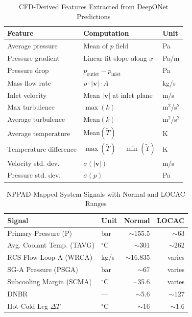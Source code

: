 \documentclass[conference]{IEEEtran}
\begin{document}
\begin{table}[htbp]
\caption{CFD-Derived Features Extracted from DeepONet Predictions}
\label{tab:features}
\centering
\begin{tabular}{lll}
\toprule
\textbf{Feature} & \textbf{Computation} & \textbf{Unit} \\
\midrule
Average pressure & Mean of $p$ field & Pa \\
Pressure gradient & Linear fit slope along $x$ & Pa/m \\
Pressure drop & $p_\text{outlet} - p_\text{inlet}$ & Pa \\
Mass flow rate & $\rho \cdot |\mathbf{v}| \cdot A$ & kg/s \\
Inlet velocity & Mean $|\mathbf{v}|$ at inlet plane & m/s \\
Max turbulence & $\max(k)$ & m$^2$/s$^2$ \\
Average turbulence & Mean$(k)$ & m$^2$/s$^2$ \\
Average temperature & Mean$(\tilde{T})$ & K \\
Temperature difference & $\max(\tilde{T}) - \min(\tilde{T})$ & K \\
Velocity std. dev. & $\sigma(|\mathbf{v}|)$ & m/s \\
Pressure std. dev. & $\sigma(p)$ & Pa \\
\bottomrule
\end{tabular}
\end{table}

\begin{table}[htbp]
\caption{NPPAD-Mapped System Signals with Normal and LOCAC Ranges}
\label{tab:nppad}
\centering
\begin{tabular}{llrr}
\toprule
\textbf{Signal} & \textbf{Unit} & \textbf{Normal} & \textbf{LOCAC} \\
\midrule
Primary Pressure (P) & bar & $\sim$155.5 & $\sim$63 \\
Avg. Coolant Temp. (TAVG) & $^\circ$C & $\sim$301 & $\sim$262 \\
RCS Flow Loop-A (WRCA) & kg/s & $\sim$16,835 & varies \\
SG-A Pressure (PSGA) & bar & $\sim$67 & varies \\
Subcooling Margin (SCMA) & $^\circ$C & $\sim$35.6 & varies \\
DNBR & — & $\sim$5.6 & $\sim$127 \\
Hot-Cold Leg $\Delta T$ & $^\circ$C & $\sim$16 & $\sim$1.6 \\
\bottomrule
\end{tabular}
\end{table}
\end{document}
